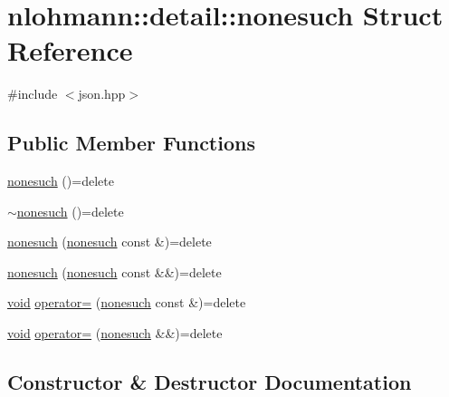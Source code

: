 \hypertarget{structnlohmann_1_1detail_1_1nonesuch}{}\section{nlohmann\+::detail\+::nonesuch Struct Reference}
\label{structnlohmann_1_1detail_1_1nonesuch}


{\ttfamily \#include $<$json.\+hpp$>$}

\subsection*{Public Member Functions}
\begin{DoxyCompactItemize}
\item 
\mbox{\hyperlink{structnlohmann_1_1detail_1_1nonesuch_a6fe87da966856c6cb06617940d90f010}{nonesuch}} ()=delete
\item 
\mbox{\hyperlink{structnlohmann_1_1detail_1_1nonesuch_a7b1119845860e548b67f1644a2084373}{$\sim$nonesuch}} ()=delete
\item 
\mbox{\hyperlink{structnlohmann_1_1detail_1_1nonesuch_a563462ef2d05fe60cdf1dc7f567dc276}{nonesuch}} (\mbox{\hyperlink{structnlohmann_1_1detail_1_1nonesuch}{nonesuch}} const \&)=delete
\item 
\mbox{\hyperlink{structnlohmann_1_1detail_1_1nonesuch_ad7719f7d2a00263be8b8d123870217d8}{nonesuch}} (\mbox{\hyperlink{structnlohmann_1_1detail_1_1nonesuch}{nonesuch}} const \&\&)=delete
\item 
\mbox{\hyperlink{namespacenlohmann_1_1detail_a59fca69799f6b9e366710cb9043aa77d}{void}} \mbox{\hyperlink{structnlohmann_1_1detail_1_1nonesuch_add6ef84c52a851e391cef514c85f2ffe}{operator=}} (\mbox{\hyperlink{structnlohmann_1_1detail_1_1nonesuch}{nonesuch}} const \&)=delete
\item 
\mbox{\hyperlink{namespacenlohmann_1_1detail_a59fca69799f6b9e366710cb9043aa77d}{void}} \mbox{\hyperlink{structnlohmann_1_1detail_1_1nonesuch_a78ca022a1b4defe4f7ba662843602231}{operator=}} (\mbox{\hyperlink{structnlohmann_1_1detail_1_1nonesuch}{nonesuch}} \&\&)=delete
\end{DoxyCompactItemize}


\subsection{Constructor \& Destructor Documentation}
\mbox{\label{structnlohmann_1_1detail_1_1nonesuch_a6fe87da966856c6cb06617940d90f010}} 
